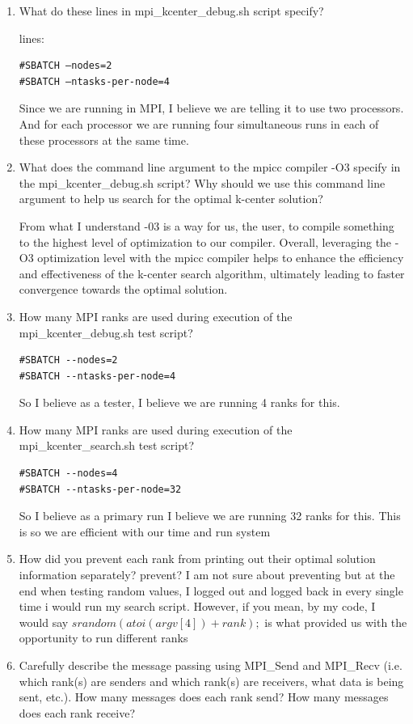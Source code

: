 \documentclass[12pt]{article}
\begin{document}
\begin{enumerate}
\item What do these lines in mpi\_kcenter\_debug.sh script specify?

lines:
\begin{verbatim}
#SBATCH –nodes=2
#SBATCH –ntasks-per-node=4
\end{verbatim}

Since we are running in MPI, I believe we are telling it to use two processors. And for each processor we are running four simultaneous runs in each of these processors at the same time.

\item What does the command line argument to the mpicc compiler -O3 specify in the mpi\_kcenter\_debug.sh script? Why should we use this command line argument to help us search for the optimal k-center solution?

From what I understand -03 is a way for us, the user, to compile something to the highest level of optimization to our compiler. Overall, leveraging the -O3 optimization level with the mpicc compiler helps to enhance the efficiency and effectiveness of the k-center search algorithm, ultimately leading to faster convergence towards the optimal solution.

\item How many MPI ranks are used during execution of the mpi\_kcenter\_debug.sh test script?
\begin{verbatim}
#SBATCH --nodes=2
#SBATCH --ntasks-per-node=4
\end{verbatim}
So I believe as a tester, I believe we are running 4 ranks for this.

\item How many MPI ranks are used during execution of the mpi\_kcenter\_search.sh test script?
\begin{verbatim}
#SBATCH --nodes=4
#SBATCH --ntasks-per-node=32
\end{verbatim}
So I believe as a primary run I believe we are running 32 ranks for this. This is so we are efficient with our time and run system


\item How did you prevent each rank from printing out their optimal solution information separately?
prevent? I am not sure about preventing but at the end when testing random values, I logged out and logged back in every single time i would run my search script. However, if you mean, by my code, I would say $srandom(atoi(argv[4]) + rank);$ is what provided us with the opportunity to run different ranks


\item Carefully describe the message passing using MPI\_Send and MPI\_Recv (i.e. which rank(s) are senders and which rank(s) are receivers, what data is being sent, etc.). How many messages does each rank send? How many messages does each rank receive?

\end{enumerate}
\end{document}
